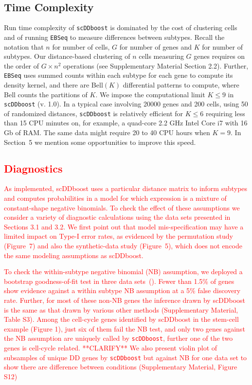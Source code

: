 \documentclass[aoas,preprint]{imsart}
\begin{document}
\subsection{Time Complexity}

Run time complexity of \texttt{scDDboost} is dominated by the cost of clustering cells and of running \texttt{EBSeq} to measure differences between subtypes. 
Recall the notation that $n$ for number of cells, $G$ for number of genes and $K$ for number of subtypes. 
Our distance-based clustering of  $n$ cells measuring $G$ genes requires on the order of $G \times n^2$ operations (see Supplementary Material Section 2.2).
Further, \texttt{EBSeq} uses summed counts within each subtype for each gene to compute its density kernel, and there are Bell$(K)$ differential patterns to compute,
where Bell counts the partitions of $K$.  
 We impose the computational limit  $K \leq 9$ in
 \verb+scDDboost+ (v. 1.0).  In a typical case involving 20000 genes and 200 cells,
 using 50 of randomized distances, \verb+scDDboost+  is relatively efficient for $K \leq 6$ requiring
 less than 15 CPU minutes on, for example, a quad-core 2.2 GHz Intel Core i7 with 16 Gb of RAM.
 The same data might require 20 to 40 CPU hours when $K=9$.  In Section~5 we mention some opportunities to improve this speed.


\subsection{\textcolor{red}{Diagnostics}}

\textcolor{red}{As implemented, scDDboost uses a particular distance matrix to inform subtypes and 
computes probabilities in a model for which expression is a mixture of constant-shape negative binomials.
To check the effect of these assumptions we consider a variety of diagnostic calculations using
the data sets presented in Sections 3.1 and 3.2. We first point out that model mis-specification 
may have a limited impact on Type-I error rates, as evidenced by the permutation study (Figure~7) and also
the synthetic-data study (Figure~5), which does not encode the same modeling assumptions as scDDboost. }


\textcolor{red}{To check the within-subtype negative binomial (NB) assumption, we deployed a bootstrap 
goodness-of-fit test in three data sets~(\cite{Yin:2013aa}). Fewer than 1.5\% of genes show evidence against
a within subtype NB assumption at a 5\% false discovery rate. 
 Further, for most of these non-NB genes the inference drawn by scDDboost is the same as that
drawn by various other methods (Supplementary Material, Table S3).   Among 
the cell-cycle genes identified by scDDboost in the stem-cell example
(Figure 1), just six of them fail the NB test, and only two genes against the NB assumption are uniquely called by \texttt{scDDboost}, further one of the two genes is cell-cycle related. **CLARIFY**
We also present violin plot of subsamples of unique DD genes by \texttt{scDDboost} but against NB for one data set to show there are difference between conditions (Supplementary Material, Figure S12)
}
\end{document}

